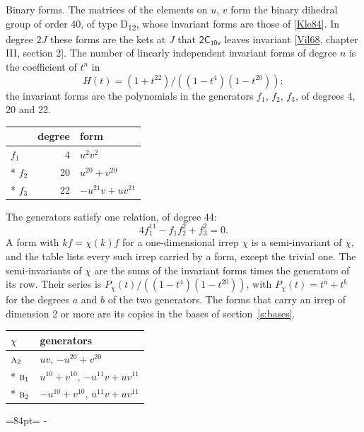 \documentclass[10pt,a4paper]{article}
\makeatletter
\renewcommand\paragraph{\@startsection{paragraph}{4}{\z@}{1.5ex plus .5ex minus .2ex}{-1em}%
  {\normalfont\small\sffamily\bfseries\color{parttitle}}}
\newcommand{\needspace}[1]{\par\penalty-100\begingroup\dimen0=#1\relax\dimen2=\pagegoal
  \advance\dimen2-\pagetotal\ifdim\dimen0>\dimen2\relax\ifdim\dimen2>0pt\vfil\break\fi\fi
  \endgroup}
\numberwithin{equation}{section}
\newcommand{\grp}[1]{\mathsf{#1}}
\newcommand{\irr}[1]{\text{\normalfont\scshape #1}}
\makeatother
\begin{document}
\paragraph{Binary forms.}
The matrices of the elements on $u$, $v$ form the binary dihedral group of order 40, of type D\textsubscript{12}, whose invariant forms are those of [\href{../../../REFERENCES.pdf\#ref.Kle84}{Kle84}]. In degree $2J$ these forms are the kets at $J$ that $\grp{2C_{10v}}$ leaves invariant [\href{../../../REFERENCES.pdf\#ref.Vil68}{Vil68}, chapter III, section 2]. \label{n:head.degree}\label{n:head.form}The number of linearly independent invariant forms of degree $n$ is the coefficient of $t^n$ in
\begin{equation}\label{e:molien}H(t) = (1 + t^{22})/((1-t^{4})(1-t^{20}));\end{equation}
the invariant forms are the polynomials in the generators $f_1$, $f_2$, $f_3$, of degrees 4, 20 and 22.
{\small\begin{longtable}{@{}lrl@{}}\toprule
& degree & form\\\midrule\endhead
\bottomrule\endfoot\endlastfoot
$f_{1}$ & 4 & $u^{2}v^{2}$\\*
$f_{2}$ & 20 & $u^{20} + v^{20}$\\*
$f_{3}$ & 22 & $-u^{21}v + uv^{21}$\\
\bottomrule\end{longtable}}
The generators satisfy one relation, of degree 44:
\begin{equation}\label{e:relation}4f_{1}^{11} - f_{1}f_{2}^{2} + f_{3}^{2} = 0.\end{equation}
A form with $k f = \chi(k) f$ for a one-dimensional irrep $\chi$ is a semi-invariant of $\chi$, and the table lists every such irrep carried by a form, except the trivial one. \label{n:head.generators}The semi-invariants of $\chi$ are the sums of the invariant forms times the generators of its row. Their series is $P_\chi(t)/((1-t^{4})(1-t^{20}))$, with $P_\chi(t) = t^{a} + t^{b}$ for the degrees $a$ and $b$ of the two generators. The forms that carry an irrep of dimension 2 or more are its copies in the bases of section~\ref{s:bases}.
{\small\begin{longtable}{@{}ll@{}}\toprule
$\chi$ & generators\\\midrule\endhead
\bottomrule\endfoot\endlastfoot
$\irr{a}_{2}$ & $uv$, $-u^{20} + v^{20}$\\*
$\irr{b}_{1}$ & $u^{10} + v^{10}$, $-u^{11}v + uv^{11}$\\*
$\irr{b}_{2}$ & $-u^{10} + v^{10}$, $u^{11}v + uv^{11}$\\
\bottomrule\end{longtable}}
\needspace{84pt}
\end{document}
